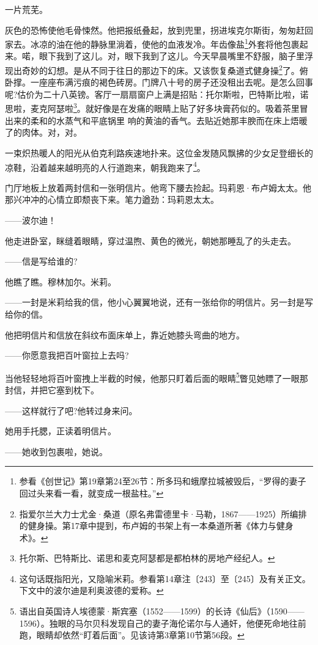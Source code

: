 \par 一片荒芜。
\par 灰色的恐怖使他毛骨悚然。他把报纸叠起，放到兜里，拐进埃克尔斯街，匆匆赶回家去。冰凉的油在他的静脉里淌着，使他的血液发冷。年齿像盐\footnote{参看《创世记》第19章第24至26节：所多玛和蛾摩拉城被毁后，“罗得的妻子回过头来看一看，就变成一根盐柱。”}外套将他包裹起来。喏，眼下我到了这儿。对，眼下我到了这儿。今天早晨嘴里不舒服，脑子里浮现出奇妙的幻想。是从不同于往日的那边下的床。又该恢复桑道式健身操\footnote{指爱尔兰大力士尤金·桑道（原名弗雷德里卡·马勒，1867——1925）所编排的健身操。第17章中提到，布卢姆的书架上有一本桑道所著《体力与健身术》。}了。俯卧撑。一座座布满污痕的褐色砖房。门牌八十号的房子还没租出去呢。是怎么回事呢?估价为二十八英镑。客厅一扇扇窗户上满是招贴：托尔斯啦，巴特斯比啦，诺思啦，麦克阿瑟啦\footnote{托尔斯、巴特斯比、诺思和麦克阿瑟都是都柏林的房地产经纪人。}。就好像是在发痛的眼睛上贴了好多块膏药似的。吸着茶里冒出来的柔和的水蒸气和平底锅里 响的黄油的香气。去贴近她那丰腴而在床上焐暖了的肉体。对，对。
\par 一束炽热暖人的阳光从伯克利路疾速地扑来。这位金发随风飘拂的少女足登细长的凉鞋，沿着越来越明亮的人行道跑来，朝我跑来了\footnote{这句话既指阳光，又隐喻米莉。参看第14章注〔243〕至〔245〕及有关正文。下文中的波尔迪是利奥波德的爱称。}。
\par 门厅地板上放着两封信和一张明信片。他弯下腰去捡起。玛莉恩·布卢姆太太。他那兴冲冲的心情立即颓丧下来。笔力遒劲：玛莉恩太太。
\par ——波尔迪！
\par 他走进卧室，眯缝着眼睛，穿过温煦、黄色的微光，朝她那睡乱了的头走去。
\par ——信是写给谁的?
\par 他瞧了瞧。穆林加尔。米莉。
\par ——一封是米莉给我的信，他小心翼翼地说，还有一张给你的明信片。另一封是写给你的信。
\par 他把明信片和信放在斜纹布面床单上，靠近她膝头弯曲的地方。
\par ——你愿意我把百叶窗拉上去吗?
\par 当他轻轻地将百叶窗拽上半截的时候，他那只盯着后面的眼睛\footnote{语出自英国诗人埃德蒙·斯宾塞（1552——1599）的长诗《仙后》（1590——1596）。独眼的马尔贝科发现自己的妻子海伦诺尔与人通奸，他便死命地往前跑，眼睛却依然“盯着后面”。见该诗第3章第10节第56段。}瞥见她瞟了一眼那封信，并把它塞到枕下。
\par ——这样就行了吧?他转过身来问。
\par 她用手托腮，正读着明信片。
\par ——她收到包裹啦，她说。
